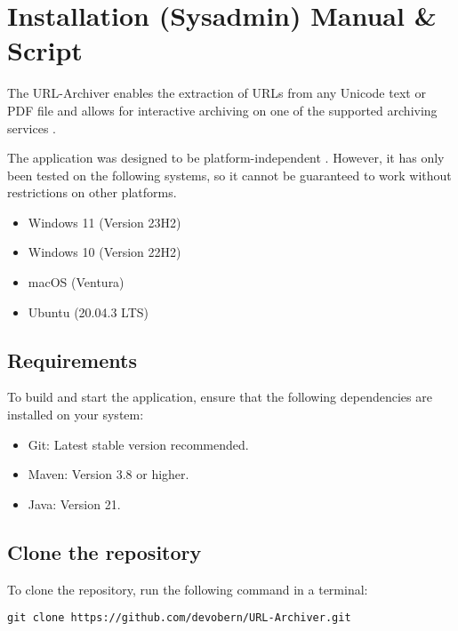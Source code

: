 
\section{Installation (Sysadmin) Manual \& Script} \label{sec::installation_manual}
The URL-Archiver enables the extraction of URLs from any Unicode text or PDF file and allows for interactive archiving
on one of the supported archiving services .
\begin{bfhWarnBox}
The application was designed to be platform-independent . However, it has only been tested on the following systems, so it cannot be guaranteed to work without restrictions on other platforms.
\begin{itemize}
	\item Windows 11 (Version 23H2)
	\item Windows 10 (Version 22H2)
	\item macOS (Ventura)
	\item Ubuntu (20.04.3 LTS)
\end{itemize}
\end{bfhWarnBox}

\subsection{Requirements}

To build and start the application, ensure that the following dependencies are installed on your system:
\begin{itemize}
	\item Git: Latest stable version recommended.
	\item Maven: Version 3.8 or higher.
	\item Java: Version 21.
\end{itemize}

\subsection{Clone the repository}

To clone the repository, run the following command in a terminal:

\begin{lstlisting}[numbers=none, caption={Command to Clone the Repository for URL-Archiver}, label={lst:git_clone}]
git clone https://github.com/devobern/URL-Archiver.git
\end{lstlisting}


